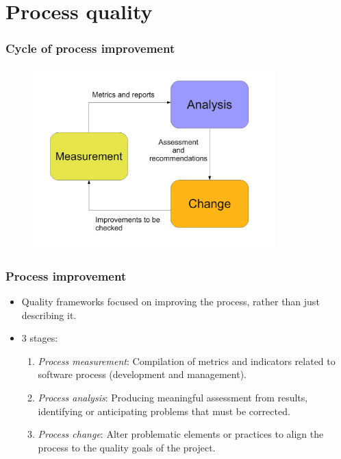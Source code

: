 \documentclass{beamer}
\begin{document}

\section{Process quality}


\begin{frame}
 \frametitle{Cycle of process improvement}
\begin{center}
\begin{figure}
 \includegraphics[height=7cm]{figs/process-improvement-cycle.pdf}
\end{figure}
\end{center}
\end{frame}


\begin{frame}
 \frametitle{Process improvement}
 \begin{itemize}
  \item Quality frameworks focused on improving the process, rather 
than just describing it.
  \item 3 stages:
  \begin{enumerate}
   \item \textit{Process measurement}: Compilation of metrics and indicators
related to software process (development and management).
   \item \textit{Process analysis}: Producing meaningful assessment from results,
identifying or anticipating problems that must be corrected.
   \item \textit{Process change}: Alter problematic elements or practices to align
the process to the quality goals of the project.
  \end{enumerate}
  \end{itemize}

\end{frame}
\end{document}
